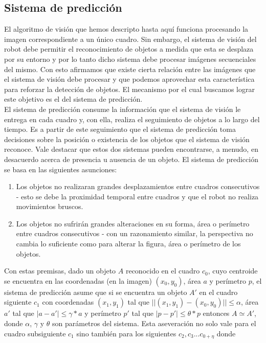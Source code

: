	\subsection{Sistema de predicción}
	El algoritmo de visión que hemos descripto hasta aquí funciona 
	procesando la imagen correspondiente a un único cuadro. Sin embargo, 
	el sistema de visión del robot debe permitir el reconocimiento de 
	objetos a medida que esta se desplaza por su entorno y por lo tanto 
	dicho sistema debe procesar imágenes secuenciales del mismo. Con 
	esto afirmamos que existe cierta relación entre las imágenes 
	que el sistema de visión debe procesar y que podemos aprovechar esta 
	característica para reforzar la detección de objetos.  El mecanismo por el cual buscamos lograr este objetivo es el del sistema de predicción.\\
\indent 	El sistema de predicción consume la información que el 
sistema de visión le entrega en cada cuadro y, con ella, realiza el 
seguimiento de objetos a lo largo del tiempo. Es a partir de este 
seguimiento que el sistema de predicción toma decisiones sobre la 
posición o existencia de los objetos que el sistema de visión 
reconoce. Vale destacar que estos dos sistemas pueden encontrarse, a 
menudo, en desacuerdo acerca de presencia u ausencia 
de un objeto.  El sistema de predicción se basa en las siguientes asunciones:
\begin{enumerate}
\item{ Los objetos no realizaran grandes desplazamientos entre cuadros 
consecutivos - esto se debe la proximidad temporal entre cuadros y que el robot no realiza movimientos bruscos.}
\item{ Los objetos no sufrirán grandes alteraciones en su forma, área 
o perímetro entre cuadros consecutivos - con un razonamiento similar, la perspectiva no cambia lo suficiente como para alterar la figura, área o perímetro de los objetos.}
\end{enumerate} 
Con estas premisas, dado un objeto $A$ reconocido en el cuadro $c_0$, 
cuyo centroide se encuentra en las coordenadas (en la imagen) $(x_0,y_0)$, área $a$ y perímetro $p$, 
el sistema de predicción asume que si se encuentra un objeto $A'$ en 
el cuadro siguiente $c_1$ con coordenadas $(x_1, y_1)$ tal que 
$||(x_1,y_1) - (x_0,y_0)||\leq \alpha$, área $a'$ tal que $|a-a'| \leq 
\gamma *a$ y perímetro $p'$ tal que $|p-p'|\leq \theta*p$ entonces $A 
\simeq A'$, donde $\alpha$, $\gamma$ y $\theta$ son parámetros del 
sistema. Esta aseveración no solo vale para el cuadro subsiguiente 
$c_1$ sino también para los siguientes $c_2,c_3 ... c_{0+\eta}$ donde 

